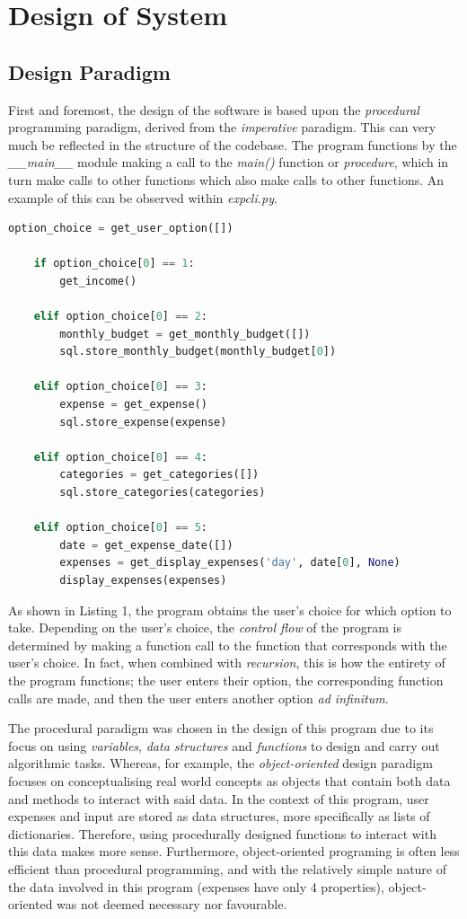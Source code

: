 \documentclass[11pt]{article}
\begin{document}
  \section{Design of System}
  \subsection{Design Paradigm}
  First and foremost, the design of the software is based upon the \textit{procedural} programming paradigm, derived from the \textit{imperative} paradigm.
  This can very much be reflected in the structure of the codebase. The program functions by the \textit{\_\_main\_\_} module making a call to the \textit{main()} function or \textit{procedure}, which in turn make calls to other functions which also make calls to other functions. An example of this can be observed within \textit{expcli.py}.
    \begin{lstlisting}[language=Python, caption=An example of procedural program design from \textit{expcli.py}, captionpos=b]
    option_choice = get_user_option([])

    if option_choice[0] == 1:
        get_income()

    elif option_choice[0] == 2:
        monthly_budget = get_monthly_budget([])
        sql.store_monthly_budget(monthly_budget[0])

    elif option_choice[0] == 3:
        expense = get_expense()
        sql.store_expense(expense)

    elif option_choice[0] == 4:
        categories = get_categories([])
        sql.store_categories(categories)

    elif option_choice[0] == 5:
        date = get_expense_date([])
        expenses = get_display_expenses('day', date[0], None)
        display_expenses(expenses)
    \end{lstlisting}
  As shown in Listing 1, the program obtains the user's choice for which option to take. Depending on the user's choice, the \textit{control flow} of the program is determined by making a function call to the function that corresponds with the user's choice. In fact, when combined with \textit{recursion}, this is how the entirety of the program functions; the user enters their option, the corresponding function calls are made, and then the user enters another option \textit{ad infinitum}.

  The procedural paradigm was chosen in the design of this program due to its focus on using \textit{variables}, \textit{data structures} and \textit{functions} to design and carry out algorithmic tasks. Whereas, for example, the \textit{object-oriented} design paradigm focuses on conceptualising real world concepts as objects that contain both data and methods to interact with said data. In the context of this program, user expenses and input are stored as data structures, more specifically as lists of dictionaries. Therefore, using procedurally designed functions to interact with this data makes more sense. Furthermore, object-oriented programing is often less efficient than procedural programming\cite{luca}, and with the relatively simple nature of the data involved in this program (expenses have only 4 properties), object-oriented was not deemed necessary nor favourable. 
\end{document}
